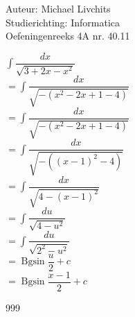 \documentclass[a4paper]{article}
\begin{document}
  
\noindent \large Auteur: Michael Livchits \\
\noindent \large Studierichting:  Informatica\\
\noindent \large Oefeningenreeks 4A nr. 40.11\\

\medskip

\normalsize

$ \displaystyle\int\dfrac{dx}{\sqrt{3 + 2x - x^2}}$\\

$ = \displaystyle\int\dfrac{dx}{\sqrt{-(x^2 - 2x + 1 - 4)}}$\\

$ = \displaystyle\int\dfrac{dx}{\sqrt{-(x^2 - 2x + 1 - 4)}}$\\

$ = \displaystyle\int\dfrac{dx}{\sqrt{-((x - 1)^2 - 4)}}$\\

$ = \displaystyle\int\dfrac{dx}{\sqrt{4 - (x-1)^2}}$\\

$ = \displaystyle\int\dfrac{du}{\sqrt{4 - u^2}}$\\

$ = \displaystyle\int\dfrac{du}{\sqrt{2^2 - u^2}}$\\

$ = \operatorname{Bgsin}\dfrac{u}{2} + c $\\

$ = \operatorname{Bgsin}\dfrac{x-1}{2} + c $\\

\begin{thebibliography}{999}
\end{thebibliography}
\end{document}
